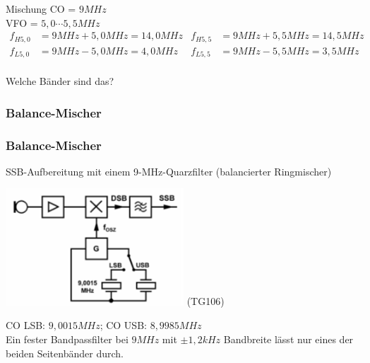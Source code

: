 \begin{frame}
  \begin{exampleblock}{Mischung}
    CO = $9 MHz$\\
    VFO = $5,0\cdots5,5MHz$
    \vspace{2em}
    \pause
    \begin{align*}
      f_{H 5,0} &= 9 MHz + 5,0 MHz = 14,0 MHz & f_{H 5,5} &= 9 MHz + 5,5 MHz = 14,5 MHz \\
      f_{L 5,0} &= 9 MHz - 5,0 MHz = 4,0 MHz  & f_{L 5,5} &= 9 MHz - 5,5 MHz = 3,5 MHz \\
    \end{align*}
  \end{exampleblock}
  \pause
  Welche Bänder sind das?
\end{frame}


\subsubsection{Balance-Mischer}

\begin{frame}
    \frametitle{Balance-Mischer}

    SSB-Aufbereitung mit einem 9-MHz-Quarzfilter (balancierter Ringmischer)

    \begin{center}
        \includegraphics[width=0.5\textwidth,height=.5\textheight,keepaspectratio]{a13/TG106.png}
	{\tiny (TG106)}
    \end{center}

    {\small CO LSB: $9,0015MHz$; CO USB: $8,9985MHz$}\\[.5em]

    Ein fester Bandpassfilter bei $9MHz$ mit $\pm1,2kHz$ Bandbreite lässt nur eines der beiden Seitenbänder durch.

\end{frame}


